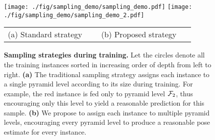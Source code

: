  
 

\begin{figure}[t]
\centering
\texttt{[image: ./fig/sampling\_demo/sampling\_demo.pdf]}
\hspace{2em}
\texttt{[image: ./fig/sampling\_demo/sampling\_demo\_2.pdf]}
\begin{small}
\begin{tabular}{C{0.45\linewidth}C{0.45\linewidth}}
(a) Standard strategy~\cite{Lin17e} & (b) Proposed strategy \\
\end{tabular}
\end{small}
\vspace{-6mm}
\caption{{\bf Sampling strategies during training.} 
    Let the circles denote all the training instances sorted in increasing order of depth from left to right. {\bf (a)} The traditional sampling strategy assigns each instance to a single pyramid level according to its size during training. For example, the red instance is fed only to pyramid level ${\cal F}_2$, thus encouraging only this level to yield a reasonable prediction for this sample. {\bf (b)} We propose to assign each instance to multiple pyramid levels, encouraging every pyramid level to produce a reasonable pose estimate for every instance.
    }
\label{fig:sampling_demo}
\end{figure}
